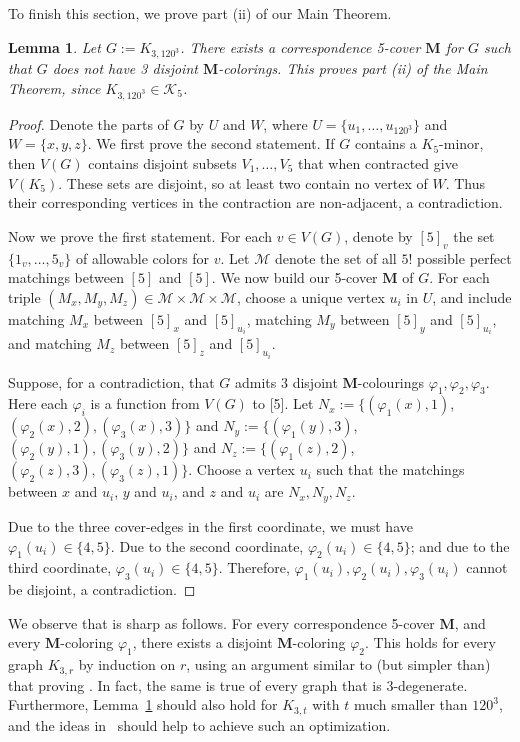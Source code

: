 \documentclass[11pt]{article}
\newtheorem{lem}[thm]{Lemma}
\theoremstyle{definition}
\newcommand\vph{\varphi}
\newcommand\K{\mathcal{K}}
\newcommand\MM{\textbf{M}}
\begin{document}
To finish this section, we prove part (ii) of our Main Theorem.

\begin{lem}\label{lem:construction_K3t}
	\label{part-ii-lem}
	Let $G:=K_{3,120^3}$.  There exists a correspondence 5-cover $\MM$ for $G$ such that $G$ does not
	have 3 disjoint $\MM$-colorings.  This proves part (ii) of the Main Theorem, 
	since $K_{3,120^3}\in \K_5$.
	
\end{lem}
\begin{proof}
	Denote the parts of $G$ by $U$ and $W$, where $U=\{u_1,\ldots,u_{120^3}\}$ and $W=\{x,y,z\}$.
	We first prove the second statement.  If $G$ contains a $K_5$-minor, then $V(G)$ contains
	disjoint subsets $V_1,\ldots,V_5$ that when contracted give $V(K_5)$.
	These sets are disjoint, so at least two contain no vertex of $W$.  Thus their corresponding
	vertices in the contraction are non-adjacent, a contradiction.

	Now we prove the first statement.
	For each $v\in V(G)$, denote by $[5]_v$ the set $\{1_v,\ldots,5_v\}$ of allowable colors for $v$.
	Let $\mathcal{M}$ denote the set of all $5!$ possible perfect matchings between $[5]$ and $[5]$.
%
	We now build our 5-cover $\MM$ of $G$.
	For each triple $(M_x,M_y,M_z) \in \mathcal{M}\times\mathcal{M}\times\mathcal{M}$, choose a unique 
	vertex $u_i$ in $U$, and include matching $M_x$ between $[5]_x$ and $[5]_{u_i}$, 
	matching $M_y$ between $[5]_y$ and $[5]_{u_i}$, and matching $M_z$ between $[5]_z$ and $[5]_{u_i}$.


	Suppose, for a contradiction, that $G$ admits 3 disjoint $\MM$-colourings 
	$\vph_1, \vph_2, \vph_3$.  Here each $\vph_i$ is a function from $V(G)$ to [5].
%
	Let
	$N_x := \{(\vph_1(x),1)$, $(\vph_2(x),2),(\vph_3(x),3)\}$ and
	$N_y := \{(\vph_1(y),3)$, $(\vph_2(y),1),(\vph_3(y),2)\}$ and
	$N_z := \{(\vph_1(z),2)$, $(\vph_2(z),3),(\vph_3(z),1)\}$.
	Choose a vertex $u_i$ such that the matchings between 
	$x$ and $u_i$, $y$ and $u_i$, and $z$ and $u_i$ are $N_x, N_y, N_z$.

Due to the three cover-edges in the first coordinate, we must have $\vph_1(u_i) \in \{4,5\}$.
Due to the second coordinate, $\vph_2(u_i) \in \{4,5\}$; and due to the third coordinate, $\vph_3(u_i) \in \{4,5\}$.  Therefore, $\vph_1(u_i),\vph_2(u_i),\vph_3(u_i)$ cannot be disjoint, a contradiction. 
\end{proof}

We observe that  is sharp as follows.  For every correspondence 5-cover $\MM$, and every
$\MM$-coloring $\vph_1$, there exists a disjoint $\MM$-coloring $\vph_2$.  This holds for every graph
$K_{3,r}$ by induction on $r$, using an argument similar to (but simpler than) that proving .
In fact, the same is true of every graph that is 3-degenerate.
Furthermore, Lemma~\ref{lem:construction_K3t} should also hold for $K_{3,t}$ with $t$ much smaller than $120^3$, and the ideas in~\cite{CH23} should help to achieve such an optimization. 
\bigskip
\end{document}
